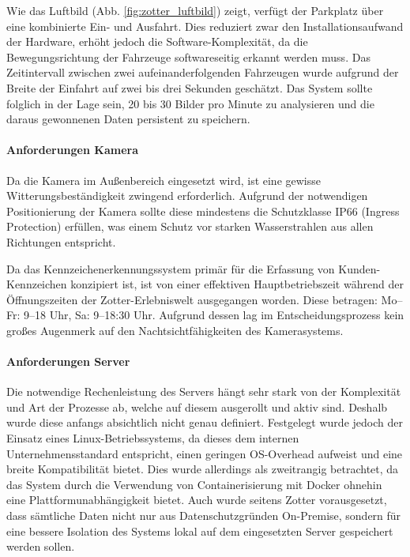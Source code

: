 Wie das Luftbild (Abb. \ref{fig:zotter_luftbild}) zeigt, verfügt der Parkplatz über eine kombinierte Ein- und Ausfahrt.
Dies reduziert zwar den Installationsaufwand der Hardware, erhöht jedoch die Software-Komplexität, da die Bewegungsrichtung der Fahrzeuge softwareseitig erkannt werden muss.
Das Zeitintervall zwischen zwei aufeinanderfolgenden Fahrzeugen wurde aufgrund der Breite der Einfahrt auf zwei bis drei Sekunden geschätzt.
Das System sollte folglich in der Lage sein, 20 bis 30 Bilder pro Minute zu analysieren und die daraus gewonnenen Daten persistent zu speichern.

\paragraph{Anforderungen Kamera}
Da die Kamera im Außenbereich eingesetzt wird, ist eine gewisse Witterungsbeständigkeit zwingend erforderlich.
Aufgrund der notwendigen Positionierung der Kamera sollte diese mindestens die Schutzklasse IP66 (Ingress Protection) erfüllen,
was einem Schutz vor starken Wasserstrahlen aus allen Richtungen entspricht. \cite{baseus_ip_ratings}

Da das Kennzeichenerkennungssystem primär für die Erfassung von Kunden-Kennzeichen konzipiert ist, ist von einer effektiven Hauptbetriebszeit während der Öffnungszeiten der Zotter-Erlebniswelt ausgegangen worden.
Diese betragen: Mo--Fr: 9--18 Uhr, Sa: 9--18:30 Uhr.
Aufgrund dessen lag im Entscheidungsprozess kein großes Augenmerk auf den Nachtsichtfähigkeiten des Kamerasystems.

\paragraph{Anforderungen Server}
Die notwendige Rechenleistung des Servers hängt sehr stark von der Komplexität und Art der Prozesse ab, welche auf diesem ausgerollt und aktiv sind.
Deshalb wurde diese anfangs absichtlich nicht genau definiert.
Festgelegt wurde jedoch der Einsatz eines Linux-Betriebssystems, da dieses dem internen Unternehmensstandard entspricht, einen geringen OS-Overhead aufweist und eine breite Kompatibilität bietet.
Dies wurde allerdings als zweitrangig betrachtet, da das System durch die Verwendung von Containerisierung mit Docker ohnehin eine Plattformunabhängigkeit bietet.
Auch wurde seitens Zotter vorausgesetzt, dass sämtliche Daten nicht nur aus Datenschutzgründen On-Premise, sondern für eine bessere Isolation des Systems lokal auf dem eingesetzten Server gespeichert werden sollen.


